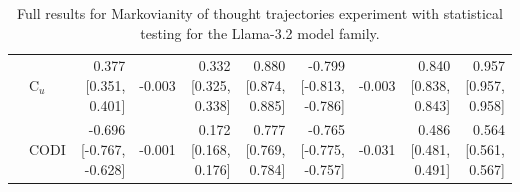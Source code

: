 \begin{table}[h!]
\begin{tabular}{llrrrrrrrr}
 & C$_u$ & 0.377 [0.351, 0.401] & -0.003 & 0.332 [0.325, 0.338] & 0.880 [0.874, 0.885] & -0.799 [-0.813, -0.786] & -0.003 & 0.840 [0.838, 0.843] & 0.957 [0.957, 0.958] \\
 & CODI & -0.696 [-0.767, -0.628] & -0.001 & 0.172 [0.168, 0.176] & 0.777 [0.769, 0.784] & -0.765 [-0.775, -0.757] & -0.031 & 0.486 [0.481, 0.491] & 0.564 [0.561, 0.567] \\
\bottomrule
\end{tabular}
\caption{Full results for Markovianity of thought trajectories experiment with statistical testing for the Llama-3.2 model family.}
\label{tab:markovianity_llama}
\end{table}
